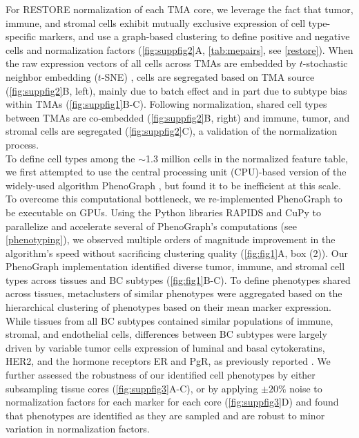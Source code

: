 \documentclass[preprint,review,3p,12pt]{elsarticle}
\begin{document}
For RESTORE normalization \cite{Chang2020} of each TMA core, we leverage the fact that tumor, immune, and stromal cells exhibit mutually exclusive expression of cell type-specific markers, and use a graph-based clustering to define positive and negative cells and normalization factors (\autoref{fig:suppfig2}A, \autoref{tab:mepairs}, see \autoref{restore}). When the raw expression vectors of all cells across TMAs are embedded by $t$-stochastic neighbor embedding ($t$-SNE) \cite{tsne2008}, cells are segregated based on TMA source (\autoref{fig:suppfig2}B, left), mainly due to batch effect and in part due to subtype bias within TMAs (\autoref{fig:suppfig1}B-C). Following normalization, shared cell types between TMAs are co-embedded (\autoref{fig:suppfig2}B, right) and immune, tumor, and stromal cells are segregated (\autoref{fig:suppfig2}C), a validation of the normalization process.\\

To define cell types among the $\sim$1.3 million cells in the normalized feature table, we first attempted to use the central processing unit (CPU)-based version of the widely-used algorithm PhenoGraph \cite{Levine2015}, but found it to be inefficient at this scale. To overcome this computational bottleneck, we re-implemented PhenoGraph to be executable on GPUs. Using the Python libraries RAPIDS \cite{cuml2020} and CuPy \cite{cupy2017} to parallelize and accelerate several of PhenoGraph's computations (see \autoref{phenotyping}), we observed multiple orders of magnitude improvement in the algorithm's speed without sacrificing clustering quality (\autoref{fig:fig1}A, box (2)). Our PhenoGraph implementation identified diverse tumor, immune, and stromal cell types across tissues and BC subtypes (\autoref{fig:fig1}B-C). To define phenotypes shared across tissues, metaclusters of similar phenotypes were aggregated based on the hierarchical clustering of phenotypes based on their mean marker expression. While tissues from all BC subtypes contained similar populations of immune, stromal, and endothelial cells, differences between BC subtypes were largely driven by variable tumor cells expression of luminal and basal cytokeratins, HER2, and the hormone receptors ER and PgR, as previously reported \cite{jackson_single-cell_2020}. We further assessed the robustness of our identified cell phenotypes by either subsampling tissue cores (\autoref{fig:suppfig3}A-C), or by applying $\pm20\%$ noise to normalization factors for each marker for each core (\autoref{fig:suppfig3}D) and found that phenotypes are identified as they are sampled and are robust to minor variation in normalization factors.\\
\end{document}
